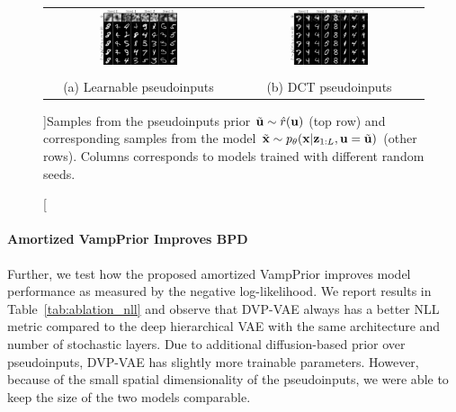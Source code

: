 \begin{figure}[t]
    \begin{tabular}{cc}
        \includegraphics[width=0.43\textwidth]{pics/5_dvp/mnist_linear_prior_samples.pdf} &
        \includegraphics[width=0.43\textwidth]{pics/5_dvp/mnist_dct_prior_samples_seed.pdf} \\ \\
        (a) Learnable pseudoinputs &
        (b) DCT pseudoinputs \\
    \end{tabular}
    \caption[][\baselineskip]{Samples from the pseudoinputs prior $\Tilde{{\mathbf{u}}} \sim \hat{r}({\mathbf{u}})$ (top row) and corresponding samples from the model $\Tilde{{\mathbf{x}}} \sim p_{\theta}({\mathbf{x}}|{\mathbf{z}}_{1:L}, {\mathbf{u}}=\Tilde{{\mathbf{u}}})$ (other rows). Columns corresponds to models trained with different random seeds.}
    \label{fig:linear_context_sampels}
    \vskip 10pt
\end{figure}


\paragraph{Amortized VampPrior Improves BPD}

Further, we test how the proposed amortized VampPrior improves model performance as measured by the negative log-likelihood. We report results in Table~\ref{tab:ablation_nll} and observe that DVP-VAE always has a better NLL metric compared to the deep hierarchical VAE with the same architecture and number of stochastic layers.
Due to additional diffusion-based prior over pseudoinputs, DVP-VAE has slightly more trainable parameters. However, because of the small spatial dimensionality of the pseudoinputs, we were able to keep the size of the two models comparable. 

